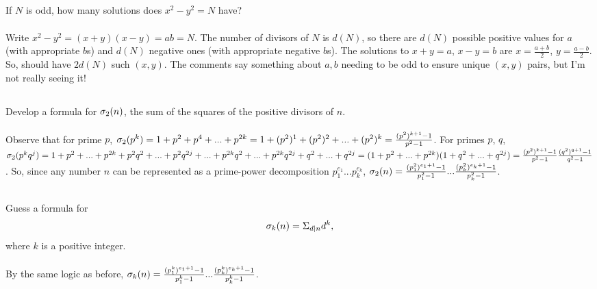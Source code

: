 \documentclass{article}
\begin{document}
\subsection{}
If $N$ is odd, how many solutions does $x^2 - y^2 = N$ have?\\~\\
Write $x^2 - y^2 = (x + y)(x - y) = ab = N$.
The number of divisors of $N$ is $d(N)$, so there are $d(N)$ possible positive
values for $a$ (with appropriate $b$s) and $d(N)$ negative ones
(with appropriate negative $b$s).
The solutions to $x + y = a$, $x - y = b$ are $x = \frac{a + b}{2}$,
$y = \frac{a - b}{2}$.
So, should have $2d(N)$ such $(x, y)$.
The comments say something about $a, b$ needing to be odd to ensure
unique $(x, y)$ pairs, but I'm not really seeing it!

\subsection{}
Develop a formula for $\sigma_2(n)$, the sum of the squares of the positive divisors
of $n$.\\~\\
Observe that for prime $p$, $\sigma_2(p^k) = 1 + p^2 + p^4 + ... + p^{2k}
= 1 + (p^2)^1 + (p^2)^2 + ... + (p^2)^k = \frac{(p^2)^{k+1} - 1}{p^2 - 1}$.
For primes $p$, $q$, $\sigma_2(p^kq^j) =
1 + p^2 + ... + p^{2k} + p^2q^2 + ... + p^2q^{2j}
+ ... + p^{2k}q^2 + ... + p^{2k}q^{2j} + q^2 + ... + q^{2j}
= (1 + p^2 + ... + p^{2k})(1 + q^2 + ... + q^{2j})
= \frac{(p^2)^{k+1} - 1}{p^2 - 1}\frac{(q^2)^{q+1} - 1}{q^2 - 1}$.
So, since any number $n$ can be represented as a prime-power decomposition
$p_1^{e_1}...p_k^{e_k}$, $\sigma_2(n) =
\frac{(p_1^2)^{e_1+1} - 1}{p_1^2 - 1}... \frac{(p_k^2)^{e_k+1} - 1}{p_k^2 - 1}$.

\subsection{}
Guess a formula for
\begin{equation*}
    \sigma_k(n) = \Sigma_{d|n}d^k,
\end{equation*}
where $k$ is a positive integer.\\~\\
By the same logic as before, $\sigma_k(n) =
\frac{(p_1^k)^{e_1+1} - 1}{p_1^k - 1}... \frac{(p_k^k)^{e_k+1} - 1}{p_k^k - 1}$.


\end{document}
